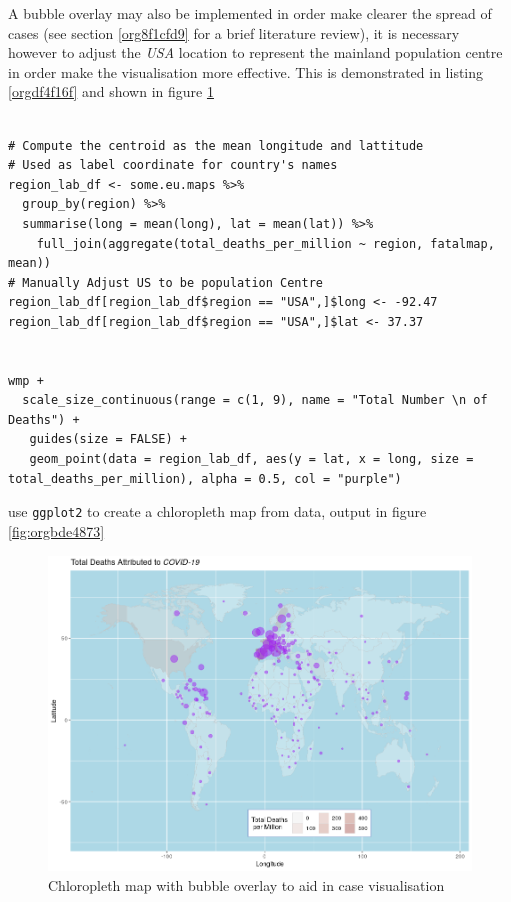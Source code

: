 \documentclass[11pt]{article}
\begin{document}
A bubble overlay may also be implemented in order make clearer the spread of cases (see section \ref{org8f1cfd9} for a brief literature review), it is necessary however to adjust the \emph{USA} location to represent the mainland population centre in order make the visualisation more effective. This is demonstrated in listing \ref{orgdf4f16f} and shown in figure \ref{fig:orga1d9f48}

\begin{listing}[htbp]
\begin{verbatim}

# Compute the centroid as the mean longitude and lattitude
# Used as label coordinate for country's names
region_lab_df <- some.eu.maps %>%
  group_by(region) %>%
  summarise(long = mean(long), lat = mean(lat)) %>%
    full_join(aggregate(total_deaths_per_million ~ region, fatalmap, mean))
# Manually Adjust US to be population Centre
region_lab_df[region_lab_df$region == "USA",]$long <- -92.47
region_lab_df[region_lab_df$region == "USA",]$lat <- 37.37


wmp +
  scale_size_continuous(range = c(1, 9), name = "Total Number \n of Deaths") +
   guides(size = FALSE) +
   geom_point(data = region_lab_df, aes(y = lat, x = long, size = total_deaths_per_million), alpha = 0.5, col = "purple")
\end{verbatim}
\caption{\label{orgdf4f16f}use \texttt{ggplot2} to create a chloropleth map from data, output in figure \ref{fig:orgbde4873}}
\end{listing}

\begin{figure}[htbp]
\centering
\includegraphics[width=16cm]{FirstChAllbub.png}
\caption{\label{fig:orga1d9f48}Chloropleth map with bubble overlay to aid in case visualisation}
\end{figure}
\end{document}
